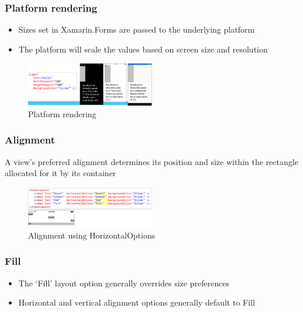 \documentclass{article}
\begin{document}
\subsubsection{Platform rendering}
\begin{itemize}
    \item Sizes set in Xamarin.Forms are passed to the underlying platform
    \item The platform will scale the values based on screen size and resolution
\end{itemize}


\begin{figure}[H]
    \centering
    \includegraphics[width=0.5\textwidth]{xaml-platform-rendering.png}
    \caption{Platform rendering}
\end{figure}

\subsubsection{Alignment}

A view's preferred alignment determines its position and size within the rectangle allocated for it by its container

\begin{figure}[H]
    \centering
    \includegraphics[width=0.5\textwidth]{xaml-alingment.png}
    \caption{Alignment using HorizontalOptions}
\end{figure}


\subsubsection{Fill}


\begin{itemize}
    \item The `Fill' layout option generally overrides size preferences
    \item Horizontal and vertical alignment options generally default to Fill
\end{itemize}
\end{document}
